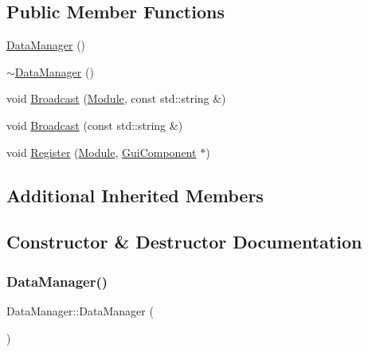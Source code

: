\subsection*{Public Member Functions}
\begin{DoxyCompactItemize}
\item 
\mbox{\hyperlink{class_data_manager_ac2eec7fa355109eda41308e1de76d2a8}{Data\+Manager}} ()
\item 
\mbox{\hyperlink{class_data_manager_a291f3b4df4392598b2d7064da062705f}{$\sim$\+Data\+Manager}} ()
\item 
void \mbox{\hyperlink{class_data_manager_a645613a4c6cca77e73aff3c9a05fd696}{Broadcast}} (\mbox{\hyperlink{_mediator_2_mediator_2_commons_8h_a88683b64d84542943724ba0f211153af}{Module}}, const std\+::string \&)
\item 
void \mbox{\hyperlink{class_data_manager_a46cc380fc22a3069d3e55800b3f39d4f}{Broadcast}} (const std\+::string \&)
\item 
void \mbox{\hyperlink{class_data_manager_a7be4a3267e02031eb2825fb7dd3dc4eb}{Register}} (\mbox{\hyperlink{_mediator_2_mediator_2_commons_8h_a88683b64d84542943724ba0f211153af}{Module}}, \mbox{\hyperlink{class_gui_component}{Gui\+Component}} $\ast$)
\end{DoxyCompactItemize}
\subsection*{Additional Inherited Members}


\subsection{Constructor \& Destructor Documentation}
\mbox{\label{class_data_manager_ac2eec7fa355109eda41308e1de76d2a8}} 
\subsubsection{\texorpdfstring{DataManager()}{DataManager()}}
{\footnotesize\ttfamily Data\+Manager\+::\+Data\+Manager (\begin{DoxyParamCaption}{ }\end{DoxyParamCaption})}

\mbox{\label{class_data_manager_a291f3b4df4392598b2d7064da062705f}} 
